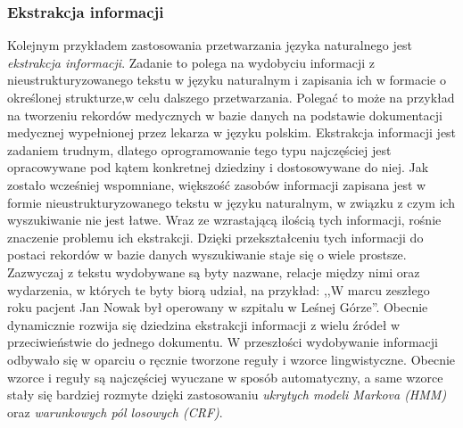\documentclass[a4paper, twoside, 12pt]{report}
\begin{document}
            \subsubsection{Ekstrakcja informacji}
                Kolejnym przykładem zastosowania przetwarzania języka naturalnego jest \emph{ekstrakcja informacji}. Zadanie
                to polega na wydobyciu informacji z nieustrukturyzowanego tekstu w języku naturalnym i zapisania ich w
                formacie o określonej strukturze,w celu dalszego
                przetwarzania. Polegać to może na przykład na tworzeniu rekordów medycznych w bazie danych na podstawie
                dokumentacji medycznej wypełnionej przez lekarza w języku polskim. Ekstrakcja informacji jest zadaniem
                trudnym, dlatego oprogramowanie tego typu najczęściej jest opracowywane pod kątem konkretnej dziedziny i
                dostosowywane do niej. Jak zostało wcześniej wspomniane, większość zasobów informacji zapisana jest w
                formie nieustrukturyzowanego tekstu w języku naturalnym, w związku z czym ich wyszukiwanie nie jest łatwe.
                Wraz ze wzrastającą ilością tych informacji, rośnie znaczenie problemu ich ekstrakcji. Dzięki
                przekształceniu tych informacji do postaci rekordów w bazie danych wyszukiwanie staje się o wiele prostsze.
                Zazwyczaj z tekstu wydobywane są byty nazwane, relacje między nimi oraz wydarzenia, w których te byty
                biorą udział, na przykład: ,,W marcu zeszłego roku pacjent Jan Nowak był operowany w szpitalu w Leśnej
                Górze''. Obecnie dynamicznie rozwija się dziedzina ekstrakcji informacji z wielu źródeł w przeciwieństwie
                do jednego dokumentu. W przeszłości wydobywanie informacji odbywało się w oparciu o ręcznie tworzone
                reguły i wzorce lingwistyczne. Obecnie wzorce i reguły są najczęściej wyuczane w sposób automatyczny,
                a same wzorce stały się bardziej rozmyte dzięki zastosowaniu \emph{ukrytych modeli Markova (HMM)} oraz
                \emph{warunkowych pól losowych (CRF)}\cite{INFORMATIONEXTRACTION}.
\end{document}
